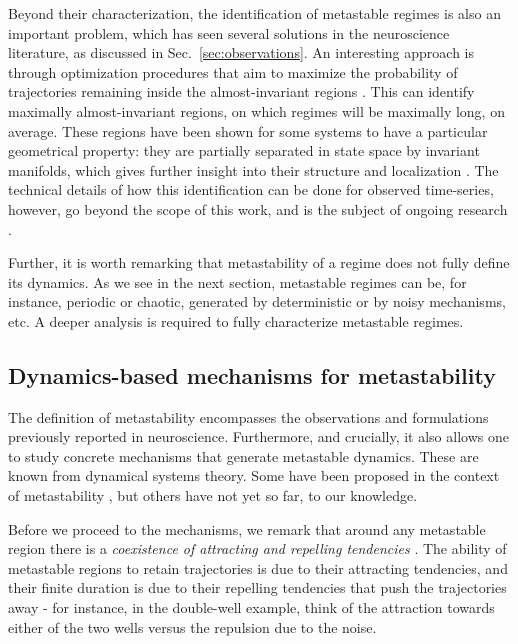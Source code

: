 Beyond their characterization, the identification of metastable regimes is also an important problem, which has seen several solutions in the neuroscience literature, as discussed in Sec.~\ref{sec:observations}. An interesting approach is through optimization procedures that aim to maximize the probability of trajectories remaining inside the almost-invariant regions \cite{froyland2003detecting, froyland2005statistically, dellnitz2003congestion}. This can identify maximally almost-invariant regions, on which regimes will be maximally long, on average. These regions have been shown for some systems to have a particular geometrical property: they are partially separated in state space by invariant manifolds, which gives further insight into their structure and localization \cite{froyland2009almost}. 
The technical details of how this identification can be done for observed time-series, however, go beyond the scope of this work, and is the subject of ongoing research \cite{froyland2018robust}. 

Further, it is worth remarking that metastability of a regime does not fully define its dynamics. As we see in the next section, metastable regimes can be, for instance, periodic or chaotic, generated by deterministic or by noisy mechanisms, etc. A deeper analysis is required to fully characterize metastable regimes. 



\subsection{Dynamics-based mechanisms for metastability} \label{sec:mechanisms}

The definition of metastability encompasses the observations and formulations previously reported in neuroscience. Furthermore, and crucially, it also allows one to study concrete mechanisms that generate metastable dynamics. These are known from dynamical systems theory. Some have been proposed in the context of metastability \cite{graben2019metastable, cavanna2018dynamic, brinkman2022metastable}, but others have not yet so far, to our knowledge.

Before we proceed to the mechanisms, we remark that around any metastable region there is a \textit{coexistence of attracting and repelling tendencies} \cite{tognoli2014metastable, kaneko2003chaotic}. The ability of metastable regions to retain trajectories is due to their attracting tendencies, and their finite duration is due to their repelling tendencies that push the trajectories away - for instance, in the double-well example, think of the attraction towards either of the two wells versus the repulsion due to the noise.

